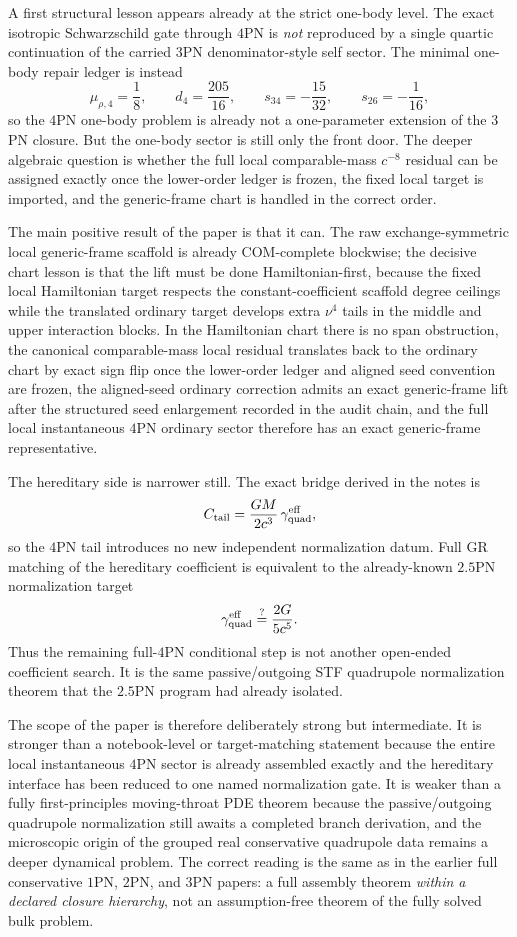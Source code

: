 \documentclass[11pt]{article}
\begin{document}
A first structural lesson appears already at the strict one-body level.  The
exact isotropic Schwarzschild gate through $4$PN is \emph{not} reproduced by a
single quartic continuation of the carried $3$PN denominator-style self sector.
The minimal one-body repair ledger is instead
\[
\mu_{\rho,4}=\frac18,
\qquad
 d_4=\frac{205}{16},
\qquad
 s_{34}=-\frac{15}{32},
\qquad
 s_{26}=-\frac1{16},
\]
so the $4$PN one-body problem is already not a one-parameter extension of the
$3$PN closure.  But the one-body sector is still only the front door.  The
deeper algebraic question is whether the full local comparable-mass $c^{-8}$
residual can be assigned exactly once the lower-order ledger is frozen, the
fixed local target is imported, and the generic-frame chart is handled in the
correct order.

The main positive result of the paper is that it can.  The raw exchange-symmetric
local generic-frame scaffold is already COM-complete blockwise; the decisive
chart lesson is that the lift must be done Hamiltonian-first, because the fixed
local Hamiltonian target respects the constant-coefficient scaffold degree
ceilings while the translated ordinary target develops extra $\nu^4$ tails in
the middle and upper interaction blocks.  In the Hamiltonian chart there is no
span obstruction, the canonical comparable-mass local residual translates back
to the ordinary chart by exact sign flip once the lower-order ledger and aligned
seed convention are frozen, the aligned-seed ordinary correction admits an exact
generic-frame lift after the structured seed enlargement recorded in the audit
chain, and the full local instantaneous $4$PN ordinary sector therefore has an
exact generic-frame representative.

The hereditary side is narrower still.  The exact bridge derived in the notes is
\[
C_{\rm tail}=\frac{GM}{2c^3}\,\gamma_{\rm quad}^{\rm eff},
\]
so the $4$PN tail introduces no new independent normalization datum.  Full GR
matching of the hereditary coefficient is equivalent to the already-known
$2.5$PN normalization target
\[
\gamma_{\rm quad}^{\rm eff}\stackrel{?}{=}\frac{2G}{5c^5}.
\]
Thus the remaining full-$4$PN conditional step is not another open-ended
coefficient search.  It is the same passive/outgoing STF quadrupole
normalization theorem that the $2.5$PN program had already isolated.

The scope of the paper is therefore deliberately strong but intermediate.  It is
stronger than a notebook-level or target-matching statement because the entire
local instantaneous $4$PN sector is already assembled exactly and the hereditary
interface has been reduced to one named normalization gate.  It is weaker than a
fully first-principles moving-throat PDE theorem because the passive/outgoing
quadrupole normalization still awaits a completed branch derivation, and the
microscopic origin of the grouped real conservative quadrupole data remains a
deeper dynamical problem.  The correct reading is the same as in the earlier
full conservative $1$PN, $2$PN, and $3$PN papers: a full assembly theorem
\emph{within a declared closure hierarchy}, not an assumption-free theorem of
the fully solved bulk problem.
\end{document}
